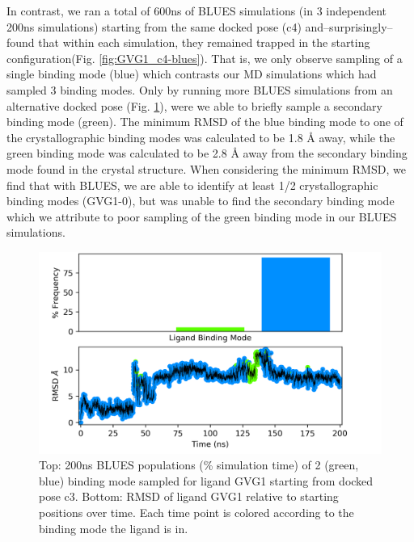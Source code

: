 In contrast, we ran a total of 600ns of BLUES simulations (in 3 independent 200ns simulations) starting from the same docked pose (c4) and--surprisingly--found that within each simulation, they remained trapped in the starting configuration(Fig. \ref{fig:GVG1_c4-blues}).
That is, we only observe sampling of a single binding mode (blue) which contrasts our MD simulations which had sampled 3 binding modes.
Only by running more BLUES simulations from an alternative docked pose (Fig. \ref{fig:GVG1_c3-blues}), were we able to briefly sample a secondary binding mode (green).
The minimum RMSD of the blue binding mode to one of the crystallographic binding modes was calculated to be 1.8 {\AA} away, while the green binding mode was calculated to be 2.8 {\AA} away from the secondary binding mode found in the crystal structure.
When considering the minimum RMSD, we find that with BLUES, we are able to identify at least 1/2 crystallographic binding modes (GVG1-0), but was unable to find the secondary binding mode which we attribute to poor sampling of the green binding mode in our BLUES simulations.

\begin{figure}
    \centering
    \includegraphics{chapter6/Figures/GVG_1_c3-14709106.png}
    \caption[GVG1 (c3) BLUES Populations]{Top: 200ns BLUES populations (\% simulation time) of 2 (green, blue) binding mode sampled for ligand GVG1 starting from docked pose c3. Bottom: RMSD of ligand GVG1 relative to starting positions over time. Each time point is colored according to the binding mode the ligand is in.}
    \label{fig:GVG1_c3-blues}
\end{figure}

